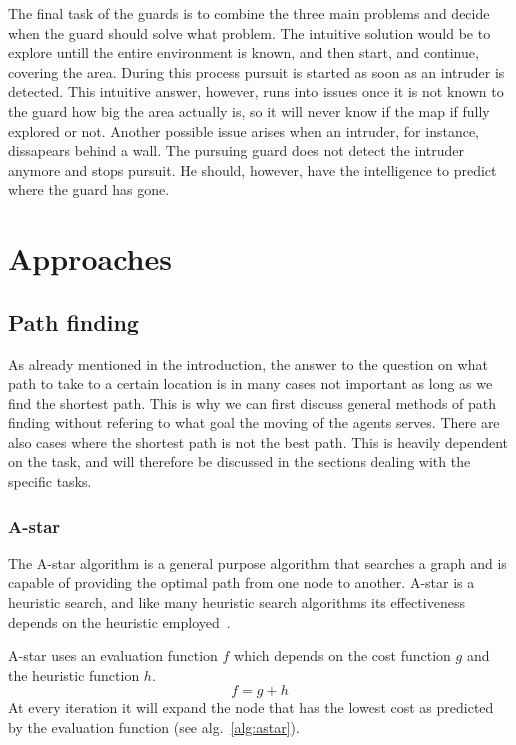 \documentclass{report}
\begin{document}
	The final task of the guards is to combine the three main problems and decide when the guard should solve what problem. The intuitive solution would be to explore untill the entire environment is known, and then start, and continue, covering the area. During this process pursuit is started as soon as an intruder is detected. This intuitive answer, however, runs into issues once it is not known to the guard how big the area actually is, so it will never know if the map if fully explored or not. Another possible issue arises when an intruder, for instance, dissapears behind a wall. The pursuing guard does not detect the intruder anymore and stops pursuit. He should, however, have the intelligence to predict where the guard has gone.

\chapter{Approaches}
	
	\section{Path finding}
		As already mentioned in the introduction, the answer to the question on what path to take to a certain location is in many cases not important as long as we find the shortest path. This is why we can first discuss general methods of path finding without refering to what goal the moving of the agents serves. There are also cases where the shortest path is not the best path. This is heavily dependent on the task, and will therefore be discussed in the sections dealing with the specific tasks.

		\subsection{A-star}
			The A-star algorithm is a general purpose algorithm that searches a graph and is capable of providing the optimal path from one node to another. A-star is a heuristic search, and like many heuristic search algorithms its effectiveness depends on the heuristic employed~\cite{4082128}.

			A-star uses an evaluation function $f$ which depends on the cost function $g$ and the heuristic function $h$.
			\begin{equation}
				\label{eq:astarevaluation}
			 	f = g + h
			\end{equation} 
			At every iteration it will expand the node that has the lowest cost as predicted by the evaluation function (see alg.~\ref{alg:astar}).
\end{document}
